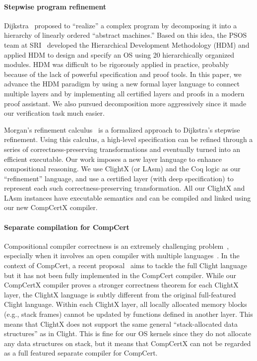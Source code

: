 \paragraph{Stepwise program refinement}
Dijkstra~\cite{Dijkstra72} proposed to ``realize'' a complex program
by decomposing it into a hierarchy of linearly ordered ``abstract
machines.''  Based on this idea, the PSOS team at SRI~\cite{psos80}
developed the Hierarchical Development Methodology (HDM) and applied
HDM to design and specify an OS using 20 hierarchically organized
modules. HDM was difficult to be rigorously applied in practice,
probably because of the lack of powerful specification and proof
tools. In this paper, we advance the HDM paradigm by using a new formal
layer language to connect multiple layers and by implementing all
certified layers and proofs in a modern proof assistant. We also
pursued decomposition more aggressively since it made our
verification task much easier.

Morgan's refinement calculus~\cite{morgan94} is a formalized approach
to Dijkstra's stepwise refinement. Using this calculus, a high-level
specification can be refined through a series of
correctness-preserving transformations and eventually turned into an
efficient executable. Our work imposes a new layer language to enhance
compositional reasoning. We use ClightX (or
LAsm) and the Coq logic as our ``refinement'' language,
and use a certified layer (with deep specification)
to represent each such correctness-preserving transformation.
All our ClightX and LAsm instances have executable semantics and can be
compiled and linked using our new CompCertX compiler.

\paragraph{Separate compilation for CompCert} Compositional 
compiler correctness is an extremely challenging
problem~\cite{BentonH09,hur12}, especially when it involves an open
compiler with multiple languages~\cite{perconti14}.  In the context of
CompCert, a recent proposal~\cite{beringer14}
aims to tackle the full Clight language but it has not been
fully implemented in the CompCert compiler.  While our CompCertX
compiler proves a stronger correctness theorem for each ClightX layer,
the ClightX language is subtly different from the original
full-featured Clight language. Within each ClightX layer, all locally
allocated memory blocks (e.g., stack frames) cannot be updated by
functions defined in another layer. This means that ClightX does not
support the same general ``stack-allocated data structures'' as in
Clight. This is fine for our OS kernels since they do not allocate any
data structures on stack, but it means that CompCertX can not be
regarded as a full featured separate compiler for CompCert.


